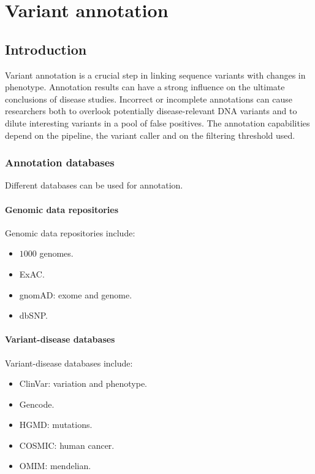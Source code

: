 \graphicspath{{chapters/laboratory/04/images/}}
\chapter{Variant annotation}

\section{Introduction}
Variant annotation is a crucial step in linking sequence variants with changes in phenotype.
Annotation results can have a strong influence on the ultimate conclusions of disease studies.
Incorrect or incomplete annotations can cause researchers both to overlook potentially disease-relevant DNA variants and to dilute interesting variants in a pool of false positives.
The annotation capabilities depend on the pipeline, the variant caller and on the filtering threshold used.


	\subsection{Annotation databases}
	Different databases can be used for annotation.

		\subsubsection{Genomic data repositories}
		Genomic data repositories include:

		\begin{multicols}{4}
			\begin{itemize}
				\item $1000$ genomes.
				\item ExAC.
				\item gnomAD: exome and genome.
				\item dbSNP.
			\end{itemize}
		\end{multicols}

		\subsubsection{Variant-disease databases}
		Variant-disease databases include:

		\begin{multicols}{3}
			\begin{itemize}
				\item ClinVar: variation and phenotype.
				\item Gencode.
				\item HGMD: mutations.
				\item COSMIC: human cancer.
				\item OMIM: mendelian.
			\end{itemize}
		\end{multicols}

